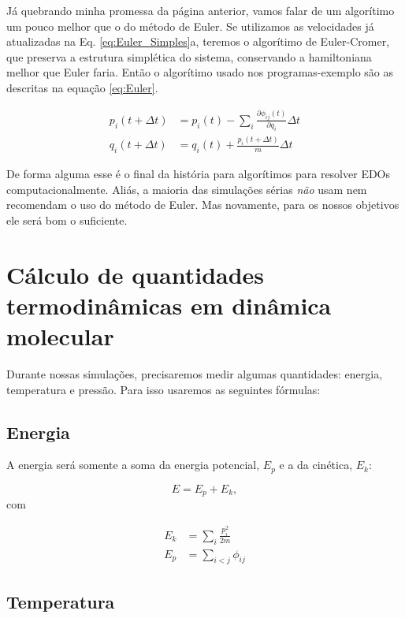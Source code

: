 \documentclass[twoside, a4paper]{article}
\newcommand{\phiij}{\phi_{ij}}
\newcommand{\del}[2]{\frac{\partial #1}{\partial #2}}
\begin{document}
Já quebrando minha promessa da página anterior, vamos falar de um algorítimo um pouco melhor que o do método de Euler. Se utilizamos as velocidades já atualizadas na Eq. \ref{eq:Euler_Simples}a, teremos o algorítimo de Euler-Cromer, que preserva a estrutura simplética do sistema, conservando a hamiltoniana melhor que Euler faria. Então o algorítimo usado nos programas-exemplo são as descritas na equação \ref{eq:Euler}.

\begin{subequations}
	\begin{align}
		p_i(t+\Delta t) &= p_i(t) -\sum_i \del{\phiij(t)}{q_i} \Delta t \\
		q_i(t+\Delta t) &= q_i(t) + \frac{p_i(t+\Delta t)}{m} \Delta t
	\end{align}
	\label{eq:Euler}
\end{subequations}

De forma alguma esse é o final da história para algorítimos para resolver EDOs computacionalmente. Aliás, a maioria das simulações sérias \emph{não} usam nem recomendam o uso do método de Euler. Mas novamente, para os nossos objetivos ele será bom o suficiente.

\section{Cálculo de quantidades termodinâmicas em dinâmica molecular}

Durante nossas simulações, precisaremos medir algumas quantidades: energia, temperatura e pressão. Para isso usaremos as seguintes fórmulas:

\subsection{Energia}

A energia será somente a soma da energia potencial, $E_p$ e a da cinética, $E_k$:

\begin{equation}
	E = E_p + E_k,
\end{equation}
com 

\begin{subequations}
	\begin{align}
		E_k &= \sum_i  \frac{p_i^2}{2m} \\ 
		E_p &= \sum_{i < j}  \phiij
	\end{align}
\end{subequations}

\subsection{Temperatura}
\end{document}
